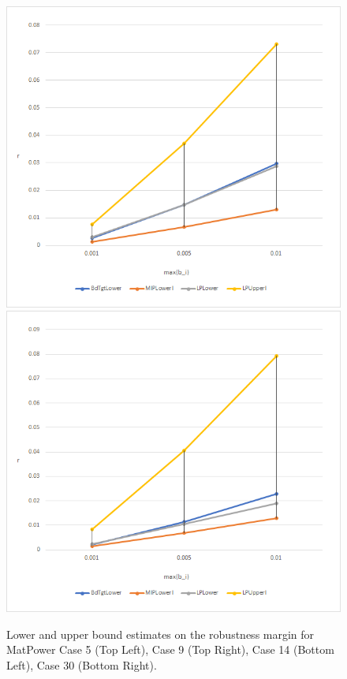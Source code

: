 \begin{figure}[htp!]
\begin{center}
\includegraphics[scale=0.45]{Figures/Case14}
\includegraphics[scale=0.45]{Figures/Case30}
\caption{Lower and upper bound estimates on the robustness margin for MatPower Case 5 (Top Left), Case 9 (Top Right), Case 14 (Bottom Left), Case 30 (Bottom Right).} 
\label{fig:Graphs1} 
\end{center}
\end{figure}

